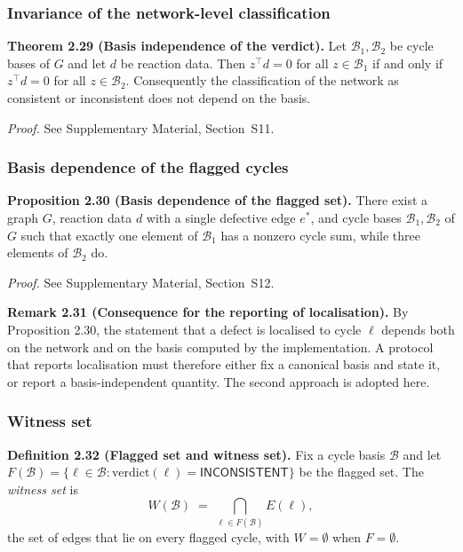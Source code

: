 \documentclass[11pt,a4paper]{article}
\theoremstyle{pstyle}
\theoremstyle{definition}
\theoremstyle{remark}
\begin{document}
\subsubsection{Invariance of the network-level classification}

\par\noindent\textbf{Theorem 2.29 (Basis independence of the verdict).}\label{thm:basis-verdict} 
Let $\mathcal{B}_1,\mathcal{B}_2$ be cycle bases of $G$ and let $d$ be
reaction data. Then $z^{\top}d = 0$ for all $z\in\mathcal{B}_1$ if and
only if $z^{\top}d=0$ for all $z\in\mathcal{B}_2$. Consequently the
classification of the network as consistent or inconsistent does not
depend on the basis.
\par

\noindent\emph{Proof.} See Supplementary Material, Section~S11.

\subsubsection{Basis dependence of the flagged cycles}

\par\noindent\textbf{Proposition 2.30 (Basis dependence of the flagged set).}\label{prop:basis-localisation} 
There exist a graph $G$, reaction data $d$ with a single defective edge
$e^{\ast}$, and cycle bases $\mathcal{B}_1,\mathcal{B}_2$ of $G$ such
that exactly one element of $\mathcal{B}_1$ has a nonzero cycle sum,
while three elements of $\mathcal{B}_2$ do.
\par

\noindent\emph{Proof.} See Supplementary Material, Section~S12.

\par\noindent\textbf{Remark 2.31 (Consequence for the reporting of localisation).}\label{rem:loc-consequence} 
By Proposition 2.30, the statement that a defect is
localised to cycle $\ell$ depends both on the network and on the basis
computed by the implementation. A protocol that reports localisation
must therefore either fix a canonical basis and state it, or report a
basis-independent quantity. The second approach is adopted here.
\par

\subsubsection{Witness set}

\par\noindent\textbf{Definition 2.32 (Flagged set and witness set).}\label{def:witness} 
Fix a cycle basis $\mathcal{B}$ and let
$F(\mathcal{B}) = \{\ell\in\mathcal{B} :
\mathrm{verdict}(\ell)=\textsf{INCONSISTENT}\}$ be the flagged set. The
\emph{witness set} is
\begin{equation}
  W(\mathcal{B}) \;=\; \bigcap_{\ell\in F(\mathcal{B})} E(\ell),
  \label{eq:witness}
\end{equation}
the set of edges that lie on every flagged cycle, with
$W = \emptyset$ when $F=\emptyset$.
\par
\end{document}
